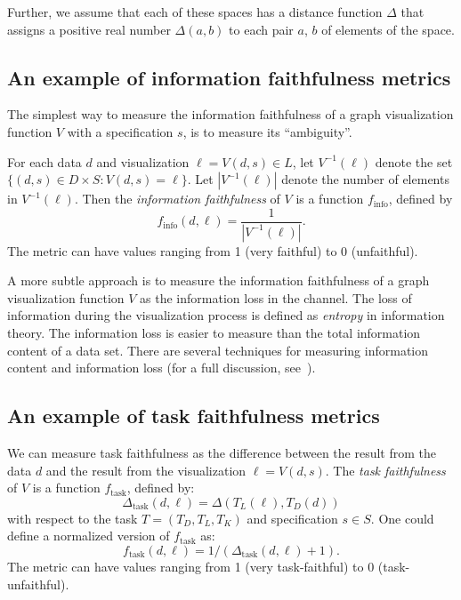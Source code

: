 \documentclass[10pt,journal,cspaper,compsoc]{IEEEtran}
\begin{document}
Further, we assume that each of these spaces has a distance function $\Delta$ that
assigns a positive real number $\Delta(a, b)$ to each pair $a$, $b$ of
elements of the space.



\subsection{An example of information faithfulness metrics}
The simplest way to measure the information faithfulness of a graph visualization function $V$ with a specification $s$, is to measure its ``ambiguity''. 

For each data $d$ and visualization $\ell= V(d,s) \in L$, let $V^{-1} (\ell)$ denote the set $\{ (d,s) \in D \times S : V(d,s) = \ell \}$. Let $| V^{-1}(\ell) |$ denote the number of elements in $V^{-1} (\ell)$. Then the \emph{information faithfulness} of $V$ is a function $f_\text{info}$, defined by
\begin{equation}
  f_\text{info}(d,\ell) = \frac{1}{| V^{-1}(\ell) | }.
\end{equation}
The metric can have values ranging from 1 (very faithful) to 0 (unfaithful).


A more subtle approach is to measure the information faithfulness of a graph visualization function $V$ as the information loss in the channel. The loss of information during the visualization
process is defined as \emph{entropy} in information theory. The information loss is easier to measure than the total information content of a data set.
There are several techniques for measuring information content and information loss (for a full discussion, see~\cite{purchase2008theoretical}).

\subsection{An example of task faithfulness metrics}
We can measure task faithfulness as the difference between the result from the data $d$ and the result from the visualization $\ell=V(d,s)$. The \emph{task faithfulness} of $V$ is a function $f_\text{task}$, defined by:
\begin{equation}
\Delta_\text{task}(d,\ell) = \Delta (T_L(\ell) , T_D(d) )
\end{equation}
with respect to the task $T = (T_D, T_L, T_K)$ and specification $s \in S$.
One could define a normalized version of $f_\text{task}$ as:
\begin{equation}
f_\text{task}(d,\ell) = 1 / (\Delta_\text{task}(d,\ell) +1).
\end{equation}
The metric can have values ranging from 1 (very task-faithful) to 0 (task-unfaithful).
\end{document}
